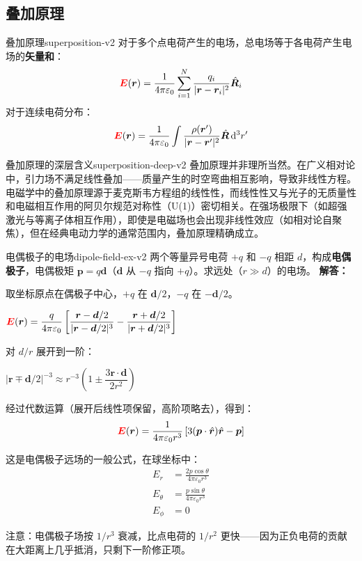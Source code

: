 \documentclass[11pt,a4paper,openany,oneside]{book}
\newcommand{\diff}{\mathrm{d}}
\newcommand{\vecE}{\textcolor{red}{\vect{E}}}
\newcommand{\eps}{\varepsilon}
\newcommand{\vect}[1]{\bm{#1}}
\newcommand{\unitvec}[1]{\hat{\vect{#1}}}
\newcommand{\difficulty}[1]{\marginnote{\textcolor{red}{\textbf{[#1]}}}}
\begin{document}
\subsection{叠加原理}

\begin{theorem}{叠加原理}{superposition-v2}
对于多个点电荷产生的电场，总电场等于各电荷产生电场的\textbf{矢量和}：
\[
\vecE(\vect{r}) = \frac{1}{4\pi\eps_0} \sum_{i=1}^N \frac{q_i}{|\vect{r} - \vect{r}_i|^2} \unitvec{R}_i
\]
对于连续电荷分布：
\[
\vecE(\vect{r}) = \frac{1}{4\pi\eps_0} \int \frac{\rho(\vect{r}')}{|\vect{r} - \vect{r}'|^2} \unitvec{R} \, \diff^3r'
\]
\end{theorem}

\begin{insight}{叠加原理的深层含义}{superposition-deep-v2}
叠加原理并非理所当然。在广义相对论中，引力场不满足线性叠加——质量产生的时空弯曲相互影响，导致非线性方程。电磁学中的叠加原理源于麦克斯韦方程组的线性性，而线性性又与光子的无质量性和电磁相互作用的阿贝尔规范对称性（U(1)）密切相关。在强场极限下（如超强激光与等离子体相互作用），即使是电磁场也会出现非线性效应（如相对论自聚焦），但在经典电动力学的通常范围内，叠加原理精确成立。
\end{insight}

\begin{example}{电偶极子的电场}{dipole-field-ex-v2}
\difficulty{提高}
两个等量异号电荷 $+q$ 和 $-q$ 相距 $d$，构成\textbf{电偶极子}，电偶极矩 $\vect{p} = q\vect{d}$（$\vect{d}$ 从 $-q$ 指向 $+q$）。求远处（$r \gg d$）的电场。
\tcblower
\textbf{解答：}

取坐标原点在偶极子中心，$+q$ 在 $\vect{d}/2$，$-q$ 在 $-\vect{d}/2$。

$\vecE(\vect{r}) = \dfrac{q}{4\pi\eps_0} \left[ \dfrac{\vect{r} - \vect{d}/2}{|\vect{r} - \vect{d}/2|^3} - \dfrac{\vect{r} + \vect{d}/2}{|\vect{r} + \vect{d}/2|^3} \right]$

对 $d/r$ 展开到一阶：

$|\vect{r} \mp \vect{d}/2|^{-3} \approx r^{-3}\left(1 \pm \dfrac{3\vect{r}\cdot\vect{d}}{2r^2}\right)$

经过代数运算（展开后线性项保留，高阶项略去），得到：
\[
\vecE(\vect{r}) = \frac{1}{4\pi\eps_0 r^3} \left[ 3(\vect{p}\cdot\unitvec{r})\unitvec{r} - \vect{p} \right]
\]

这是电偶极子远场的一般公式，在球坐标中：
\begin{align*}
E_r &= \frac{2p\cos\theta}{4\pi\eps_0 r^3} \\
E_\theta &= \frac{p\sin\theta}{4\pi\eps_0 r^3} \\
E_\phi &= 0
\end{align*}

注意：电偶极子场按 $1/r^3$ 衰减，比点电荷的 $1/r^2$ 更快——因为正负电荷的贡献在大距离上几乎抵消，只剩下一阶修正项。
\end{example}
\end{document}
